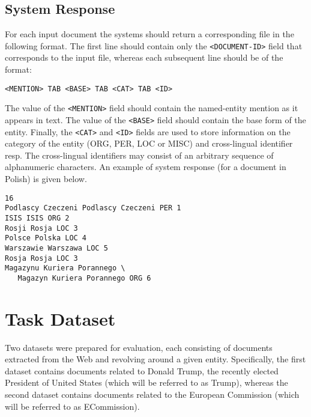 \documentclass[11pt]{article}
\begin{document}
\subsection{System Response}
\label{subsec:input}

For each input document the systems should return a corresponding file in the following format.
The first line should contain only the \verb+<DOCUMENT-ID>+ field that corresponds to the input file,
whereas each subsequent line should be of the format:

\begin{small}
\begin{verbatim}
<MENTION> TAB <BASE> TAB <CAT> TAB <ID>
\end{verbatim}
\end{small}

\noindent The value of the \verb+<MENTION>+ field should contain the named-entity mention as it 
appears in text. The value of the \verb+<BASE>+ field should contain the base form of the
entity. Finally, the \verb+<CAT>+ and \verb+<ID>+ fields are used to store information
on the category of the entity (ORG, PER, LOC or MISC) and cross-lingual identifier resp. 
The cross-lingual identifiers may consist of an arbitrary sequence of alphanumeric characters.
An example of system response (for a document in Polish) is given below.

\begin{small}
\begin{verbatim}
16
Podlascy Czeczeni Podlascy Czeczeni PER 1
ISIS ISIS ORG 2
Rosji Rosja LOC 3
Polsce Polska LOC 4
Warszawie Warszawa LOC 5
Rosja Rosja LOC 3
Magazynu Kuriera Porannego \
   Magazyn Kuriera Porannego ORG 6
\end{verbatim}	    
\end{small}

\section{Task Dataset}
\label{sec:annotation}

Two datasets were prepared for evaluation, each consisting of documents
extracted from the Web and revolving around a given entity.
Specifically, the first dataset contains documents related to Donald
Trump, the recently elected President of United States (which will be
referred to as {\sc Trump}), whereas the second dataset contains
documents related to the European Commission (which will be referred to
as {\sc ECommission}).
\end{document}
